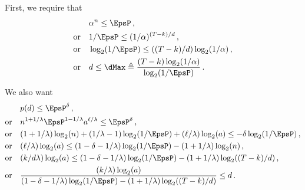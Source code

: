 	First, we require that 
	\begin{align*}
		&\alpha^n \leq \EpsP\,,\\
		\text{or}\quad &
			1/\EpsP \leq (1/\alpha)^{(T - k)/d}\,,\\
		\text{or}\quad &
			\log_2(1/\EpsP) \leq ((T - k)/d)\log_2(1/\alpha)\,,\\
		\text{or}\quad &
			d \leq \dMax \triangleq \frac{(T - k)\log_2(1/\alpha)}{\log_2(1/\EpsP)}
			\,.
	\end{align*}

	We also want 
	\begin{align*}
		&p(d) \leq \EpsP^{\delta}\,,\\
		\text{or}\quad &
			n^{1+1/\lambda} \EpsP^{1 - 1/\lambda} a^{\ell/\lambda} \leq \EpsP^\delta \,,\\
		\text{or}\quad &
			(1+1/\lambda)\log_2(n)
			+ (1/\lambda - 1)\log_2(1/\EpsP) 
			+ (\ell/\lambda) \log_2(a) \leq -\delta \log_2(1/\EpsP) \,,\\
		\text{or}\quad &			
			(\ell/\lambda) \log_2(a) \leq (1-\delta - 1/\lambda) \log_2(1/\EpsP) - (1+1/\lambda)\log_2(n)\,,\\
		\text{or}\quad &			
			(k/d\lambda) \log_2(a) \leq (1-\delta - 1/\lambda) \log_2(1/\EpsP) - (1+1/\lambda)\log_2((T-k)/d)\,,\\
		\text{or}\quad &			
			\frac{(k/\lambda) \log_2(a)}{(1-\delta - 1/\lambda) \log_2(1/\EpsP) - (1+1/\lambda)\log_2((T-k)/d)} \leq d
			\,.
	\end{align*}
	
